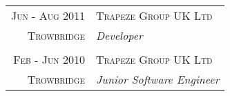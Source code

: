 \begin{tabular}{r|p{11cm}}

\textsc{Jun - Aug 2011} & \textsc{Trapeze Group UK Ltd}\\ 
\textsc{Trowbridge} & \emph{Developer}\\

\multicolumn{2}{c}{} \\


\textsc{Feb - Jun 2010} & \textsc{Trapeze Group UK Ltd}\\ 
\textsc{Trowbridge} & \emph{Junior Software Engineer}\\

\end{tabular}